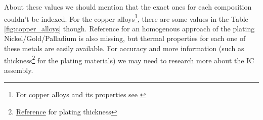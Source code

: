 \documentclass[final]{cubedoc}
\begin{document}
	About  these values we should mention that the exact ones for each composition couldn't be indexed. For the copper alloys\footnote{For copper alloys and its properties see \cite{copperalloydata}}, there are some values in the Table \ref{fig:copper_alloys} though. Reference for an homogenous approach of the plating Nickel/Gold/Palladium is also missing, but thermal properties for each one of these metals are easily available. For accuracy and more information (such as thickness\footnote{ \href{https://web.archive.org/web/20200818132539/https://www.idt.com/us/en/support/knowledge-base/what-are-specifications-terminal-plating-plating-methods-and-plating-thickness-any-idt-part}{Reference} for plating thickness} for the plating materials) we may need to research more about the IC assembly.
	
	\begin{table}[h!]
		\centering
		\caption{Material Bulk properties of plating-metals}
		\label{tab:plate}
	\end{table}
	
	
\end{document}
